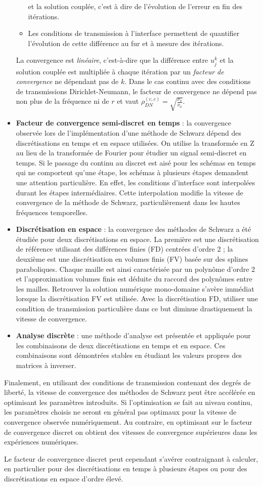 \begin{itemize}
\begin{itemize}
	et la solution couplée, c'est à dire
	de l'évolution de l'erreur en fin des itérations.
\item Les conditions de transmission à l'interface permettent
	de quantifier l'évolution de cette différence au fur et
	à mesure des itérations.
\end{itemize}
 La convergence est \textit{linéaire},
 c'est-à-dire que la différence entre $u_j^k$ et la solution couplée
 est multipliée à chaque itération par un
 \textit{facteur de convergence} ne dépendant
 pas de $k$. Dans le cas continu avec des conditions
 de transmissions Dirichlet-Neumann, le facteur de convergence ne
 dépend pas non plus de la fréquence ni de $r$ et vaut
 $\rho_{DN}^{(c,c)}=\sqrt{\frac{\nu_o}{\nu_a}}$.
\item \textbf{Facteur de convergence semi-discret en temps} :
la convergence observée lors de l'implémentation d'une méthode
de Schwarz dépend des discrétisations en temps et en espace utilisées.
On utilise la transformée en Z au lieu de la transformée de Fourier
pour étudier un signal semi-discret en temps.
Si le passage du continu au discret est aisé pour les schémas
en temps qui ne comportent qu'une étape, les schémas
à plusieurs étapes demandent une attention particulière. En effet,
les conditions d'interface sont interpolées durant les étapes
intermédiaires. Cette interpolation
modifie la vitesse de convergence de la méthode de Schwarz,
particulièrement dans les hautes fréquences temporelles.
\item \textbf{Discrétisation en espace} :
la convergence des méthodes de Schwarz a été étudiée pour
deux discrétisations en espace. La première est une discrétisation
de référence utilisant des différences finies (FD)
centrées d'ordre 2 ;
la deuxième est une discrétisation en volumes finis (FV) basée sur
des splines paraboliques.
Chaque maille est ainsi caractérisée par un polynôme d'ordre 2
et l'approximation volumes finis est déduite du raccord des
polynômes entre les mailles.
Retrouver la solution numérique mono-domaine s'avère immédiat
lorsque la discrétisation FV est utilisée.
Avec la discrétisation FD, utiliser une condition de transmission
particulière dans ce but diminue
drastiquement la vitesse de convergence.
\item \textbf{Analyse discrète} :
une méthode d'analyse est présentée et appliquée pour les combinaisons
de deux discrétisations en temps et en espace. Ces combinaisons
sont démontrées stables en étudiant les valeurs propres des
matrices à inverser.
\end{itemize}
Finalement, en utilisant des conditions de transmission
contenant des degrés de liberté, la vitesse de convergence
des méthodes de Schwarz peut être accélérée en optimisant les
paramètres introduits.
Si l'optimisation se fait au niveau continu, les paramètres
choisis ne seront en général pas optimaux pour la vitesse de
convergence observée numériquement. Au contraire, en optimisant
sur le facteur de convergence discret on obtient des vitesses de
convergence supérieures dans les expériences numériques.
\par
Le facteur de convergence discret peut cependant s'avérer
contraignant à calculer, en particulier pour des discrétisations
en temps à plusieurs étapes ou pour des discrétisations en espace
d'ordre élevé.
